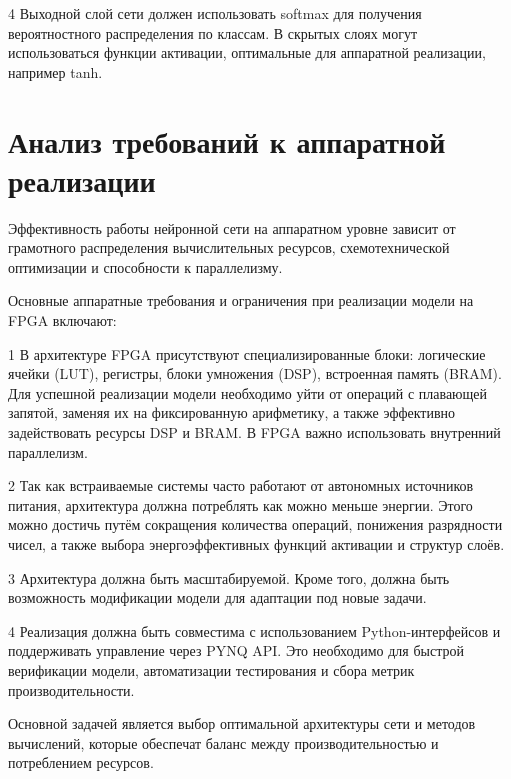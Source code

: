   4 Выходной слой сети должен использовать softmax для получения вероятностного 
распределения по классам. В скрытых слоях могут использоваться функции 
активации, оптимальные для аппаратной реализации, например tanh. 

\section{Анализ требований к аппаратной реализации}
\hspace*{12.5 mm}Эффективность работы нейронной сети на аппаратном уровне 
зависит от грамотного распределения вычислительных ресурсов, схемотехнической 
оптимизации и способности к параллелизму. 

Основные аппаратные требования и ограничения при реализации модели на FPGA 
включают:

  1 В архитектуре FPGA присутствуют специализированные блоки: логические ячейки 
(LUT), регистры, блоки умножения (DSP), встроенная память (BRAM). Для успешной 
реализации модели необходимо уйти от операций с плавающей запятой, заменяя их 
на фиксированную арифметику, а также эффективно задействовать ресурсы DSP и 
BRAM. В FPGA важно использовать внутренний параллелизм.

  2 Так как встраиваемые системы часто работают от автономных источников 
питания, архитектура должна потреблять как можно меньше энергии. Этого можно 
достичь путём сокращения количества операций, понижения разрядности чисел, а 
также выбора энергоэффективных функций активации и структур слоёв.

  3 Архитектура должна быть масштабируемой. 
Кроме того, должна быть возможность модификации модели для адаптации под новые
задачи.

  4 Реализация должна быть совместима с использованием Python-интерфейсов и 
поддерживать управление через PYNQ API. Это необходимо для быстрой верификации 
модели, автоматизации тестирования и сбора метрик производительности.

Основной задачей является выбор оптимальной архитектуры сети и методов 
вычислений, которые обеспечат баланс между производительностью и потреблением 
ресурсов.

